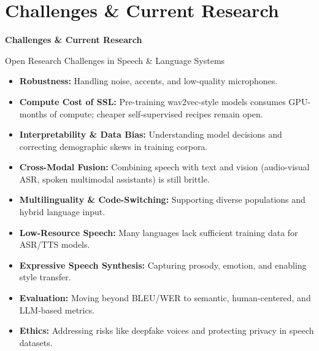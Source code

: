 \section{Challenges \& Current Research}

\begin{frame}{}
    \LARGE \textbf{Challenges \& Current Research}
\end{frame}

\begin{frame}[allowframebreaks]{Open Research Challenges in Speech \& Language Systems}

\begin{itemize}
    \item \textbf{Robustness:} Handling noise, accents, and low-quality microphones.

    \item \textbf{Compute Cost of SSL:} Pre-training wav2vec-style models consumes GPU-months of compute; cheaper self-supervised recipes remain open.

    \item \textbf{Interpretability \& Data Bias:} Understanding model decisions and correcting demographic skews in training corpora.

    \item \textbf{Cross-Modal Fusion:} Combining speech with text and vision (audio-visual ASR, spoken multimodal assistants) is still brittle.

    \item \textbf{Multilinguality \& Code-Switching:} Supporting diverse populations and hybrid language input.

    \item \textbf{Low-Resource Speech:} Many languages lack sufficient training data for ASR/TTS models.  

    \item \textbf{Expressive Speech Synthesis:} Capturing prosody, emotion, and enabling style transfer.  

    \item \textbf{Evaluation:} Moving beyond BLEU/WER to semantic, human-centered, and LLM-based metrics.  

    \item \textbf{Ethics:} Addressing risks like deepfake voices and protecting privacy in speech datasets.
\end{itemize}

\end{frame}
